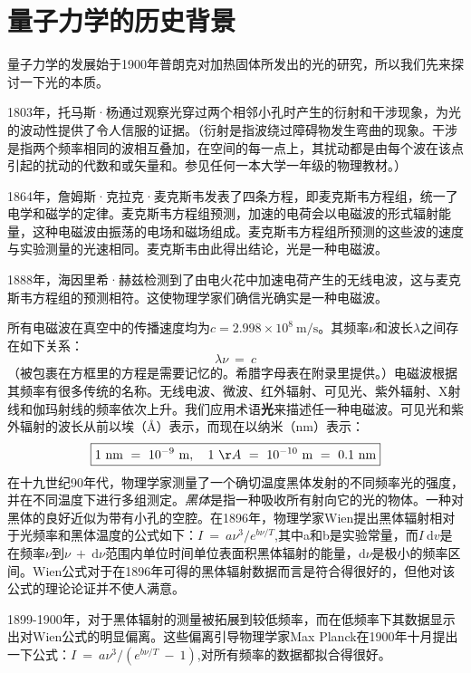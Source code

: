 \documentclass[12pt,a4paper,openany]{ctexbook}
\begin{document}
\section{量子力学的历史背景}
\begin{flushleft}
    \setlength{\parindent}{2em}
量子力学的发展始于1900年普朗克对加热固体所发出的光的研究，所以我们先来探讨一下光的本质。

1803年，托马斯·杨通过观察光穿过两个相邻小孔时产生的衍射和干涉现象，为光的波动性提供了令人信服的证据。（衍射是指波绕过障碍物发生弯曲的现象。干涉是指两个频率相同的波相互叠加，在空间的每一点上，其扰动都是由每个波在该点引起的扰动的代数和或矢量和。参见任何一本大学一年级的物理教材。）

1864年，詹姆斯·克拉克·麦克斯韦发表了四条方程，即麦克斯韦方程组，统一了电学和磁学的定律。麦克斯韦方程组预测，加速的电荷会以电磁波的形式辐射能量，这种电磁波由振荡的电场和磁场组成。麦克斯韦方程组所预测的这些波的速度与实验测量的光速相同。麦克斯韦由此得出结论，光是一种电磁波。

1888年，海因里希·赫兹检测到了由电火花中加速电荷产生的无线电波，这与麦克斯韦方程组的预测相符。这使物理学家们确信光确实是一种电磁波。

所有电磁波在真空中的传播速度均为$c=2.998\times 10^8\ \text{m/s}$。其频率$\nu$和波长$\lambda$之间存在如下关系：
\begin{equation}
\boxed{\lambda \nu\ =\ c}
\end{equation}
（被包裹在方框里的方程是需要记忆的。希腊字母表在附录里提供。）电磁波根据其频率有很多传统的名称。无线电波、微波、红外辐射、可见光、紫外辐射、X射线和伽玛射线的频率依次上升。我们应用术语\textbf{光}来描述任一种电磁波。可见光和紫外辐射的波长从前以埃（\AA）表示，而现在以纳米（nm）表示：
\begin{equation}
\boxed{1\ \text{nm}\ =\ 10^{-9}\ \text{m},\quad1\ \AA\ =\ 10^{-10}\ \text{m}\ =\ 0.1\ \text{nm}}
\end{equation}
在十九世纪90年代，物理学家测量了一个确切温度黑体发射的不同频率光的强度，并在不同温度下进行多组测定。\textit{黑体}是指一种吸收所有射向它的光的物体。一种对黑体的良好近似为带有小孔的空腔。在1896年，物理学家Wien提出黑体辐射相对于光频率和黑体温度的公式如下：$I\ =\ a\nu ^3/e^{b\nu /T}$,其中a和b是实验常量，而$I\ \mathrm{d}v$是在频率$\nu$到$\nu\ +\ \mathrm{d}\nu$范围内单位时间单位表面积黑体辐射的能量，$\mathrm{d}\nu$是极小的频率区间。Wien公式对于在1896年可得的黑体辐射数据而言是符合得很好的，但他对该公式的理论论证并不使人满意。

1899-1900年，对于黑体辐射的测量被拓展到较低频率，而在低频率下其数据显示出对Wien公式的明显偏离。这些偏离引导物理学家Max Planck在1900年十月提出一下公式：$I\ =\ a\nu ^3/(e^{b\nu /T}\ -\ 1)$,对所有频率的数据都拟合得很好。


\end{flushleft}
\end{document}
